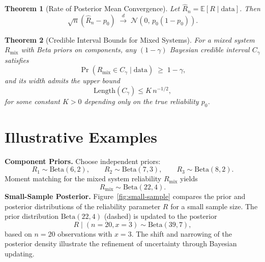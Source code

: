 \documentclass[twoside]{article}
\theoremstyle{plain}
\newtheorem{theorem}{Theorem}[section]
\theoremstyle{definition}
\begin{document}
\begin{theorem}[Rate of Posterior Mean Convergence]
Let $\hat{R}_n = \mathbb{E}[R \mid \text{data}]$. Then
\begin{equation}
\sqrt{n}(\hat{R}_n - p_0)
\;\overset{d}{\longrightarrow}\;
\mathcal{N}(0,\, p_0(1-p_0)).
\end{equation}
\end{theorem}

\begin{theorem}[Credible Interval Bounds for Mixed Systems]
For a mixed system $R_{\text{mix}}$ with Beta priors on components,  
any $(1-\gamma)$ Bayesian credible interval $C_\gamma$ satisfies
\begin{equation}
\Pr(R_{\text{mix}} \in C_\gamma \mid \text{data}) \;\geq\; 1-\gamma,
\end{equation}
and its width admits the upper bound
\begin{equation}
\text{Length}(C_\gamma) \leq K\, n^{-1/2},
\end{equation}
for some constant $K>0$ depending only on the true reliability $p_0$.
\end{theorem}

\section{Illustrative Examples}

\noindent
\textbf{Component Priors.}
Choose independent priors:
\begin{equation}
R_1 \sim \mathrm{Beta}(6,2), \qquad
R_2 \sim \mathrm{Beta}(7,3), \qquad
R_3 \sim \mathrm{Beta}(8,2).
\end{equation}
\noindent
Moment matching for the mixed system reliability $R_{\text{mix}}$ yields
\begin{equation}
R_{\text{mix}} \sim \mathrm{Beta}(22,4).
\end{equation}
\noindent
\textbf{Small-Sample Posterior.}
Figure~\ref{fig:small-sample} compares the prior and posterior distributions of the
reliability parameter $R$ for a small sample size.  
The prior distribution $\mathrm{Beta}(22,4)$ (dashed) is updated to the posterior
\begin{equation}
R \mid (n=20, x=3) \sim \mathrm{Beta}(39,7),
\end{equation}
based on $n=20$ observations with $x=3$.  
The shift and narrowing of the posterior density illustrate the refinement of uncertainty
through Bayesian updating.
\end{document}
